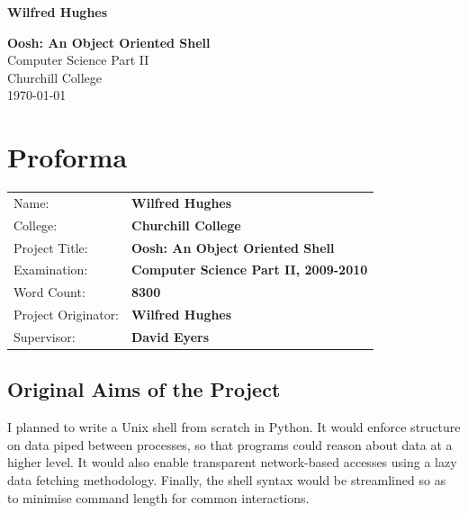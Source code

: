 \documentclass[12pt,twoside,notitlepage]{report}
\begin{document}





\pagestyle{empty}

\hfill{\LARGE \bf Wilfred Hughes}

\vspace*{60mm}
\begin{center}
\Huge
{\bf Oosh: An Object Oriented Shell} \\
\vspace*{5mm}
Computer Science Part II \\
\vspace*{5mm}
Churchill College \\
\vspace*{5mm}
\today  %
\end{center}

\cleardoublepage


\setcounter{page}{1}
\pagestyle{plain}

\chapter*{Proforma}

{\large
\begin{tabular}{ll}
Name:               & \bf Wilfred Hughes                       \\
College:            & \bf Churchill College                     \\
Project Title:      & \bf Oosh: An Object Oriented Shell \\
Examination:        & \bf Computer Science Part II, 2009-2010        \\
Word Count:         & \bf 8300 \\
Project Originator: & \bf Wilfred Hughes                    \\
Supervisor:         & \bf David Eyers                    \\ 
\end{tabular}
}

\section*{Original Aims of the Project}

I planned to write a Unix shell from scratch in Python. It would
enforce structure on data piped between processes, so that programs
could reason about data at a higher level. It would also enable
transparent network-based accesses using a lazy data fetching
methodology. Finally, the shell syntax would be streamlined so as to
minimise command length for common interactions.
\end{document}

